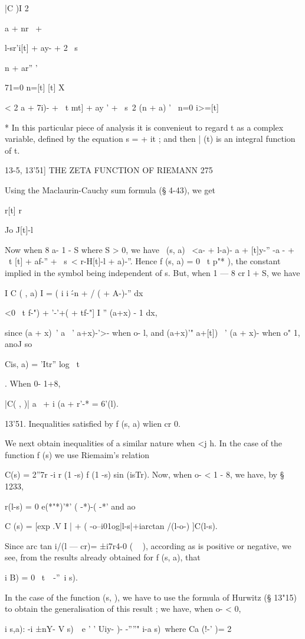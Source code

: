 |C )I 2 \ \ {a + nr \ + \ \ { l-sr'i[t] + ay- + 2 \ s\ \ {n + ar'' '

71=0 n=[t] [t] X

< 2 a + 7i)- + \ t mt] + ay ' + \ s\ 2 (n + a) ' \ n=0 i>=[t]

* In this particular piece of analysis it is convenieut to regard t as
a complex variable, defined by the equation s = + it ; and then | (t)
is an integral function of t.

13-5, 13'51] THE ZETA FUNCTION OF RIEMANN 275

Using the Maclaurin-Cauchy sum formula (§ 4-43), we get

r[t] r

Jo J[t]-l

Now when 8 a- 1 - S where S > 0, we have \ (s, a) \ <a- + l-a)- a +
[t]y-'' -a - + \ t [t] + af-'' + \ s\ < r-H[t]-l + a)-''. Hence f (s,
a) = 0 \ t p"* ), the constant implied in the symbol being independent
of s. But, when 1 — 8 cr l + S, we have

I C ( , a) I = ( i i \'-n + / ( + A-)-'' dx

<0 \ t f-") + '-'+( + tf-"] I '' (a+x) - 1 dx,

since (a + x)~' a ~' a+x)-'>- when o- l, and (a+x)'" a+[t]) ~' (a +
x)- when o" 1, anoJ so

Cis, a) = 'Itr'' log \ t\ \ }. When 0- 1+8,

|C( , )| a~ + i (a + r'-* = 6'(l).

13'51. Inequalities satisfied by f (s, a) wlien cr 0.

We next obtain inequalities of a similar nature when <j h. In the case
of the function f (s) we use Riemaim's relation

C(s) = 2''7r -i r (1 -s) f (1 -s) sin (isTr). Now, when o- < 1 - 8, we
have, by § 1233,

r(l-s) = 0 e(*"*)'*' ( -*)-( -*' and ao

C (s) = [exp .V I | + ( -o--i01og|l-s|+iarctan /(l-o-) ]C(l-s).

Since arc tan i/(l — cr)= ±i7r4-0 ( ~ ), according as is positive or
negative, we see, from the results already obtained for f (s, a), that

i B) = 0 \ t\ \ -''\ i s).

In the case of the function (s, ), we have to use the formula of
Hurwitz (§ 13"15) to obtain the generalisation of this result ; we
have, when o- < 0,

i s,a): -i ±nY- V s)\ \ e ' ' Uiy- )- -''''" i-a s)\ where Ca (!-' )=
2

}}

